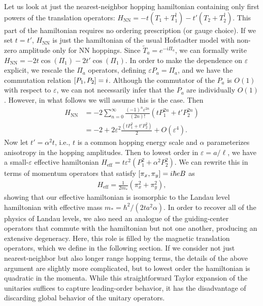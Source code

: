 \documentclass[aps,prb,twocolumn,letterpaper,twoside,nobalancelastpage,groupedaddress,amsmath,amssymb,floatfix,citeautoscript]{revtex4-1}
\begin{document}
Let us look at just the nearest-neighbor hopping hamiltonian containing only first powers of the translation operators: $H_{\text{NN}} = -t\left(T_1 + T_1^{\dag}\right) - t'\left(T_2 + T_2^{\dag}\right)$. This part of the hamiltonian requires no ordering prescription (or gauge choice). If we set $t = t'$, $H_{\text{NN}}$ is just the hamiltonian of the usual Hofstadter model with non-zero amplitude only for NN hoppings. Since $\widetilde{T}_a = e^{-i\Pi_a}$, we can formally write $H_{\text{NN}}= -2t\cos\left(\Pi_1\right) - 2 t'\cos\left(\Pi_1\right).$ In order to make the dependence on $\varepsilon$ explicit, we rescale the $\Pi_a$ operators, defining $\varepsilon P_a = \Pi_a$, and we have the commutation relation $\comm{P_1}{P_2} = i$. Although the commutator of the $P_a$ is $O(1)$ with respect to $\varepsilon$, we can not necessarily infer that the $P_a$ are individually $O(1)$. However, in what follows we will assume this is the case. Then
\begin{align*}
H_{\text{NN}} &= -2\sum_{n=0}^{\infty}  \frac{(-1)^{n}\varepsilon^{2n}}{(2n)!} \left(t P^{2n}_1 + t'P^{2n}_2\right)\\
&= -2 + 2\varepsilon^2\frac{\left(t P^{2}_1 + t' P^{2}_2\right)}{2} +O(\varepsilon^4).
\end{align*}
Now let $t' = \alpha^2 t$, i.e., $t$ is a common hopping energy scale and $\alpha$ parameterizes anisotropy in the hopping amplitudes. Then to lowest order in $\varepsilon = a/\ell$, we have a small-$\varepsilon$ effective hamiltonian $H_{\text{eff}}= t\varepsilon^2 \left(P^{2}_1 + \alpha^2P^{2}_2\right)$. We can rewrite this in terms of momentum operators that satisfy $\comm{\pi_x}{\pi_y} = i\hbar e B$ as
\begin{align*}
H_{\text{eff}} = \frac{1}{2m_{\ast}}\left(\pi_x^2 + \pi_y^2\right),
\end{align*}
showing that our effective hamiltonian is isomorphic to the Landau level hamiltonian with effective mass $m_{\ast} = \hbar^2/(2ta^2\alpha)$. In order to recover all of the physics of Landau levels, we also need an analogue of the guiding-center operators that commute with the hamiltonian but not one another, producing an extensive degeneracy. Here, this role is filled by the magnetic translation operators, which we define in the following section. If we consider not just nearest-neighbor but also longer range hopping terms, the details of the above argument are slightly more complicated, but to lowest order the hamiltonian is quadratic in the momenta. While this straightforward Taylor expansion of the unitaries suffices to capture leading-order behavior, it has the disadvantage of discarding global behavior of the unitary operators.
\end{document}
